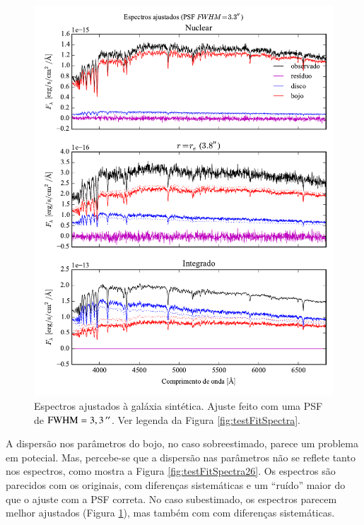 \begin{figure}
	\includegraphics{figuras/simulation_spectra_psf33}
	\caption[Espectros ajustados (teste com PSF $\mathrm{FWHM} = 3,3\,\arcs$).]
	{Espectros ajustados à galáxia sintética. Ajuste feito com uma PSF de
	$\mathrm{FWHM} = 3,3\,\arcs$. Ver legenda da Figura \ref{fig:testFitSpectra}.}
	\label{fig:testFitSpectra33}
\end{figure}

A dispersão nos parâmetros do bojo, no caso sobreestimado, parece um problema em
potecial. Mas, percebe-se que a dispersão nas parâmetros não se reflete tanto
nos espectros, como mostra a Figura \ref{fig:testFitSpectra26}. Os espectros são
parecidos com os originais, com diferenças sistemáticas e um ``ruído'' maior do
que o ajuste com a PSF correta. No caso subestimado, os espectros parecem melhor
ajustados (Figura \ref{fig:testFitSpectra33}), mas também com com diferenças
sistemáticas.

